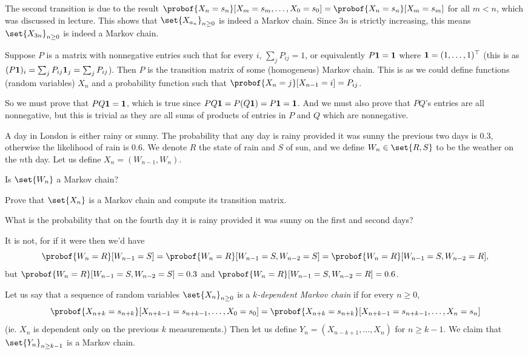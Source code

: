     The second transition is due to the result $\probof{X_n=s_n}[X_m=s_m,\dots,X_0=s_0]=\probof{X_n=s_n}[X_m=s_m]$ for all $m<n$, which was discussed in lecture.
    This shows that $\set{X_{a_n}}_{n\geq0}$ is indeed a Markov chain.
    Since $3n$ is strictly increasing, this means $\set{X_{3n}}_{n\geq0}$ is indeed a Markov chain.

    \item Suppose $P$ is a matrix with nonnegative entries such that for every $i$, $\sum_j P_{ij}=1$, or equivalently $P{\bf1}={\bf1}$ where ${\bf1}=(1,\dots,1)^\top$
    (this is as $(P{\bf1})_i=\sum_jP_{ij}{\bf1}_j=\sum_jP_{ij}$).
    Then $P$ is the transition matrix of some (homogeneus) Markov chain.
    This is as we could define functions (random variables) $X_n$ and a probability function such that $\probof{X_n=j}[X_{n-1}=i]=P_{ij}$.

    So we must prove that $PQ{\bf1}={\bf1}$, which is true since $PQ{\bf 1}=P(Q{\bf1})=P{\bf1}={\bf1}$.
    And we must also prove that $PQ$'s entries are all nonnegative, but this is trivial as they are all sums of products of entries in $P$ and $Q$ which are nonnegative.
\eenum

\bexerc

    A day in London is either rainy or sunny.
    The probability that any day is rainy provided it was sunny the previous two days is $0.3$, otherwise the likelihood of rain is $0.6$.
    We denote $R$ the state of rain and $S$ of sun, and we define $W_n\in\set{R,S}$ to be the weather on the $n$th day.
    Let us define $X_n=(W_{n-1},W_n)$.
    \benum
        \item Is $\set{W_n}$ a Markov chain?
        \item Prove that $\set{X_n}$ is a Markov chain and compute its transition matrix.
        \item What is the probability that on the fourth day it is rainy provided it was sunny on the first and second days?
    \eenum

\eexerc

\benum
    \item It is not, for if it were then we'd have
    $$ \probof{W_n=R}[W_{n-1}=S]=\probof{W_n=R}[W_{n-1}=S,W_{n-2}=S]=\probof{W_n=R}[W_{n-1}=S,W_{n-2}=R], $$
    but $\probof{W_n=R}[W_{n-1}=S,W_{n-2}=S]=0.3$ and $\probof{W_n=R}[W_{n-1}=S,W_{n-2}=R]=0.6$.

    \item Let us say that a sequence of random variables $\set{X_n}_{n\geq0}$ is a {\it $k$-dependent Markov chain} if for every $n\geq0$,
    $$ \probof{X_{n+k}=s_{n+k}}[X_{n+k-1}=s_{n+k-1},\dots,X_0=s_0] = \probof{X_{n+k}=s_{n+k}}[X_{n+k-1}=s_{n+k-1},\dots,X_n=s_n] $$
    (ie. $X_n$ is dependent only on the previous $k$ measurements.)
    Then let us define $Y_n=(X_{n-k+1},\dots,X_n)$ for $n\geq k-1$.
    We claim that $\set{Y_n}_{n\geq k-1}$ is a Markov chain.

